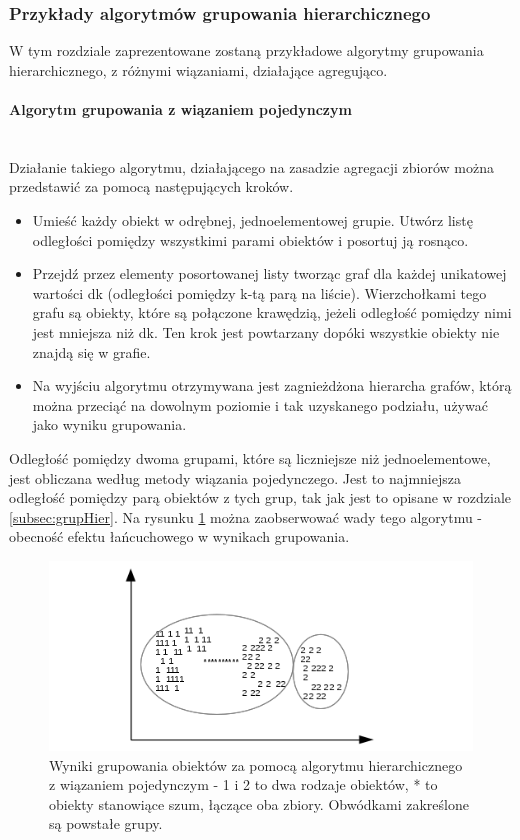 \documentclass{article}
\newcommand{\myparagraph}[1]{\paragraph{#1}\mbox{}\\}
\begin{document}
\subsubsection{Przykłady algorytmów grupowania hierarchicznego}

W tym rozdziale zaprezentowane zostaną przykładowe algorytmy grupowania hierarchicznego, z różnymi wiązaniami, działające agregująco. 

\myparagraph{Algorytm grupowania z wiązaniem pojedynczym}

Działanie takiego algorytmu, działającego na zasadzie agregacji zbiorów można przedstawić za pomocą następujących kroków.

\begin{itemize}
	\item Umieść każdy obiekt w odrębnej, jednoelementowej grupie. Utwórz listę odległości pomiędzy wszystkimi parami obiektów i posortuj ją rosnąco.
	\item Przejdź przez elementy posortowanej listy tworząc graf dla każdej unikatowej wartości dk (odległości pomiędzy k-tą parą na liście). Wierzchołkami tego grafu są obiekty, które są połączone krawędzią, jeżeli odległość pomiędzy nimi jest mniejsza niż dk. Ten krok jest powtarzany dopóki wszystkie obiekty nie znajdą się w grafie.
	\item Na wyjściu algorytmu otrzymywana jest zagnieżdżona hierarcha grafów, którą można przeciąć na dowolnym poziomie i tak uzyskanego podziału, używać jako wyniku grupowania.
\end{itemize}

Odległość pomiędzy dwoma grupami, które są liczniejsze niż jednoelementowe, jest obliczana według metody wiązania pojedynczego. Jest to najmniejsza odległość pomiędzy parą obiektów z tych grup, tak jak jest to opisane w rozdziale \ref{subsec:grupHier}. Na rysunku \ref{fig:grupHPng} można zaobserwować wady tego algorytmu - obecność efektu łańcuchowego w wynikach grupowania.

\begin{figure}[H]
	\centering
	\includegraphics[scale=0.9]{hierarchiczneGrupowanie.png}
	\caption{Wyniki grupowania obiektów za pomocą algorytmu hierarchicznego z wiązaniem pojedynczym - 1 i 2 to dwa rodzaje obiektów, * to obiekty stanowiące szum, łączące oba zbiory. Obwódkami zakreślone są powstałe grupy.}
	\label{fig:grupHPng}
\end{figure}
\end{document}
